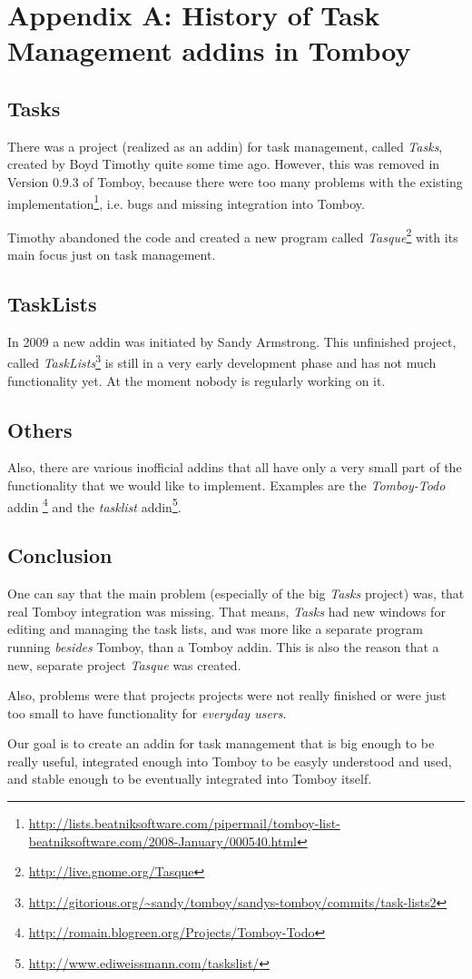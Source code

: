 \clearpage
\appendix
\section{Appendix A: History of Task Management addins in Tomboy}

\label{appendix:history}
\subsection{Tasks}
There was a project (realized as an addin) for task management, called \textit{Tasks}, created by Boyd Timothy quite some time ago. However, this was removed in Version 0.9.3 of Tomboy, because there were too many problems with the existing implementation\footnote{\url{http://lists.beatniksoftware.com/pipermail/tomboy-list-beatniksoftware.com/2008-January/000540.html}}, i.e. bugs and missing integration into Tomboy.

Timothy abandoned the code and created a new program called \textit{Tasque}\footnote{\url{http://live.gnome.org/Tasque}} with its main focus just on task management.

\subsection{TaskLists}
In 2009 a new addin was initiated by Sandy Armstrong. This unfinished project, called \textit{TaskLists}\footnote{\url{http://gitorious.org/~sandy/tomboy/sandys-tomboy/commits/task-lists2}} is still in a very early development phase and has not much functionality yet. At the moment nobody is regularly working on it.

\subsection{Others}
Also, there are various inofficial addins that all have only a very small part of the functionality that we would like to implement. Examples are the \textit{Tomboy-Todo} addin \footnote{\url{http://romain.blogreen.org/Projects/Tomboy-Todo}} and the \textit{tasklist} addin\footnote{\url{http://www.ediweissmann.com/taskslist/}}.

\subsection{Conclusion}
\label{lessons}
One can say that the main problem (especially of the big \textit{Tasks} project) was, that real Tomboy integration was missing. That means, \textit{Tasks} had new windows for editing and managing the task lists, and was more like a separate program running \textit{besides} Tomboy, than a Tomboy addin. This is also the reason that a new, separate project \textit{Tasque} was created.

Also, problems were that projects projects were not really finished or were just too small to have functionality for \textit{everyday users}.

Our goal is to create an addin for task management that is big enough to be really useful, integrated enough into Tomboy to be easyly understood and used, and stable enough to be eventually integrated into Tomboy itself.
